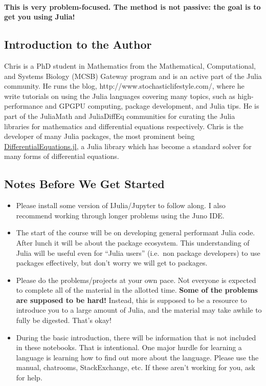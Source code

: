 \documentclass[11pt]{article}
\begin{document}
\paragraph{This is very problem-focused. The method is not passive: the
goal is to get you using
Julia!}\label{this-is-very-problem-focused.-the-method-is-not-passive-the-goal-is-to-get-you-using-julia}

    \subsection{Introduction to the
Author}\label{introduction-to-the-author}

Chris is a PhD student in Mathematics from the Mathematical,
Computational, and Systems Biology (MCSB) Gateway program and is an
active part of the Julia community. He runs the blog,
http://www.stochasticlifestyle.com/, where he write tutorials on using
the Julia languages covering many topics, such as high-performance and
GPGPU computing, package development, and Julia tips. He is part of the
JuliaMath and JuliaDiffEq communities for curating the Julia libraries
for mathematics and differential equations respectively. Chris is the
developer of many Julia packages, the most prominent being
\href{https://github.com/JuliaDiffEq/DifferentialEquations.jl}{DifferentialEquations.jl},
a Julia library which has become a standard solver for many forms of
differential equations.

    \subsection{Notes Before We Get
Started}\label{notes-before-we-get-started}

\begin{itemize}
\itemsep1pt\parskip0pt
\item
  Please install some version of IJulia/Jupyter to follow along. I also
  recommend working through longer problems using the Juno IDE.
\item
  The start of the course will be on developing general performant Julia
  code. After lunch it will be about the package ecosystem. This
  understanding of Julia will be useful even for ``Julia users''
  (i.e.~non package developers) to use packages effectively, but don't
  worry we will get to packages.
\item
  Please do the problems/projects at your own pace. Not everyone is
  expected to complete all of the material in the allotted time.
  \textbf{Some of the problems are supposed to be hard!} Instead, this
  is supposed to be a resource to introduce you to a large amount of
  Julia, and the material may take awhile to fully be digested. That's
  okay!
\item
  During the basic introduction, there will be information that is not
  included in these notebooks. That is intentional. One major hurdle for
  learning a language is learning how to find out more about the
  language. Please use the manual, chatrooms, StackExchange, etc. If
  these aren't working for you, ask for help.
\end{itemize}
\end{document}

